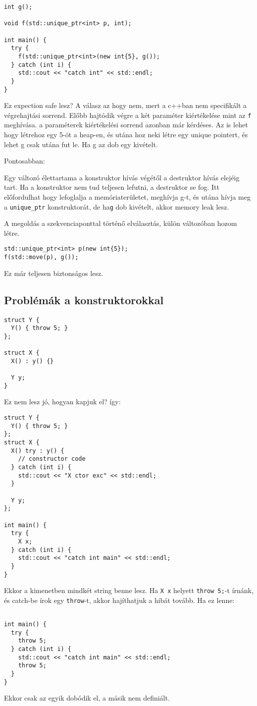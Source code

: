 \documentclass[a4paper,11.5pt]{article}
\begin{document}
			\begin{lstlisting}
int g();

void f(std::unique_ptr<int> p, int);

int main() {
  try {
    f(std::unique_ptr<int>(new int{5}, g());
  } catch (int i) {
    std::cout << "catch int" << std::endl;
  }
}
			\end{lstlisting}
		Ez expection safe lesz? A válasz az hogy nem, mert a c++ban nem specifikált a végrehajtási sorrend. Előbb hajtódik végre a két paraméter kiértékelése mint az \texttt{f} meghívása. a paraméterek kiértékelési sorrend azonban már kérdéses. Az is lehet hogy létrehoz egy 5-öt a heap-en, és utána hoz neki létre egy unique pointert, és lehet g csak utána fut le. Ha g az dob egy kivételt.
		
		Pontosabban:
		
		Egy változó élettartama a konstruktor hívás végétől a destruktor hívás elejéig tart. Ha a konstruktor nem tud teljesen lefutni, a destruktor se fog. Itt előfordulhat hogy lefoglalja a memóriaterületet, meghívja g-t, és utána hívja meg a \texttt{unique\_ptr} konstruktorát,	de ha\texttt{g} dob kivételt, akkor memory leak lesz.
		
		A megoldás a szekvenciaponttal történő elválasztás, külön változóban hozom létre.
		\begin{lstlisting}
std::unique_ptr<int> p(new int{5});
f(std::move(p), g());
		\end{lstlisting}
		Ez már teljesen biztonságos lesz.
		
		\subsection{Problémák a konstruktorokkal}
		
		\begin{lstlisting}
struct Y {
  Y() { throw 5; }
};

struct X {
  X() : y() {}

  Y y;
}
		\end{lstlisting}
		
		Ez nem lesz jó, hogyan kapjuk el? így:
		
		\begin{lstlisting}
struct Y {
  Y() { throw 5; }
};
struct X {
  X() try : y() {
    // constructor code
  } catch (int i) {
    std::cout << "X ctor exc" << std::endl;
  }

  Y y;
};

int main() {
  try {
    X x;
  } catch (int i) {
    std::cout << "catch int main" << std::endl;
  }
}
		\end{lstlisting}
		Ekkor a kimenetben mindkét string benne lesz.
		Ha \texttt{X x} helyett \texttt{throw 5;}-t írnánk, és catch-be írok egy \texttt{throw}-t, akkor hajíthatjuk a hibát tovább. Ha ez lenne:
		\begin{lstlisting}

int main() {
  try {
    throw 5;
  } catch (int i) {
    std::cout << "catch int main" << std::endl;
    throw 5;
  }
}
		\end{lstlisting}
		Ekkor csak az egyik dobódik el, a másik nem definiált.
		
\end{document}

